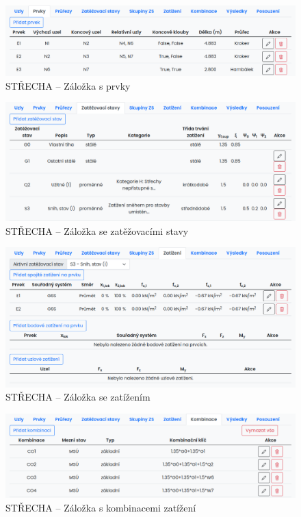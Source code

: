 \begin{figure}[H]
    \includegraphics{assets/figures/wbapp/members_tab.png}
    \caption{STŘECHA -- Záložka s prvky}
    \label{fig:members}
\end{figure}

\begin{figure}[H]
    \includegraphics{assets/figures/wbapp/load_cases_tab.png}
    \caption{STŘECHA -- Záložka se zatěžovacími stavy}
    \label{fig:load_cases}
\end{figure}

\begin{figure}[H]
    \includegraphics{assets/figures/wbapp/loads_tab.png}
    \caption{STŘECHA -- Záložka se zatížením}
    \label{fig:loads}
\end{figure}

\begin{figure}[H]
    \includegraphics{assets/figures/wbapp/combos_tab.png}
    \caption{STŘECHA -- Záložka s kombinacemi zatížení}
    \label{fig:combos_tab}
\end{figure}

